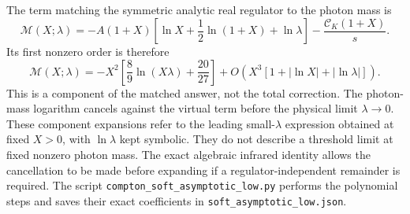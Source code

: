 The term matching the symmetric analytic real regulator to the photon
mass is
\begin{equation}
 \mathcal M(X;\lambda)
 =-A(1+X)\left[\ln X+\frac12\ln(1+X)+\ln\lambda\right]
                      -\frac{\mathcal C_K(1+X)}s.
\end{equation}
Its first nonzero order is therefore
\begin{equation}
 \mathcal M(X;\lambda)
 =-X^2\left[\frac89\ln(X\lambda)+\frac{20}{27}\right]
             +O\!\left(X^3[1+|\ln X|+|\ln\lambda|]\right).
\end{equation}
This is a component of the matched answer, not the total correction.
The photon-mass logarithm cancels against the virtual term before the
physical limit $\lambda\to0$.  These component expansions refer to the leading small-$\lambda$
expression obtained at fixed $X>0$, with $\ln\lambda$ kept symbolic.
They do not describe a threshold limit at fixed nonzero photon mass.
The exact algebraic
infrared identity allows the cancellation to be made before expanding
if a regulator-independent remainder is required.
The script \nolinkurl{compton_soft_asymptotic_low.py} performs the polynomial
steps and saves their exact coefficients in \nolinkurl{soft_asymptotic_low.json}.

